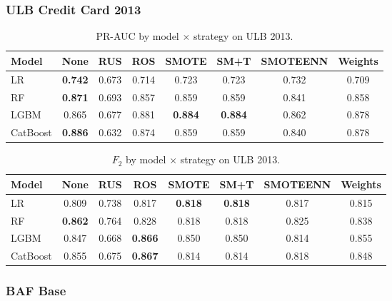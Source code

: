 
\subsubsection{ULB Credit Card 2013}

\begin{table}[ht]
\centering
\caption{PR-AUC by model $\times$ strategy on ULB 2013.}
\label{tab:factorial_ulb_prauc}
\begin{tabular}{l c c c c c c c}
\toprule
Model & None & RUS & ROS & SMOTE & SM+T & SMOTEENN & Weights \\
\midrule
LR         & \textbf{0.742} & 0.673 & 0.714 & 0.723 & 0.723 & 0.732 & 0.709 \\
RF         & \textbf{0.871} & 0.693 & 0.857 & 0.859 & 0.859 & 0.841 & 0.858 \\
LGBM       & 0.865 & 0.677 & 0.881 & \textbf{0.884} & \textbf{0.884} & 0.862 & 0.878 \\
CatBoost   & \textbf{0.886} & 0.632 & 0.874 & 0.859 & 0.859 & 0.840 & 0.878 \\
\bottomrule
\end{tabular}
\end{table}

\begin{table}[ht]
\centering
\caption{$F_2$ by model $\times$ strategy on ULB 2013.}
\label{tab:factorial_ulb_f2}
\begin{tabular}{l c c c c c c c}
\toprule
Model & None & RUS & ROS & SMOTE & SM+T & SMOTEENN & Weights \\
\midrule
LR         & 0.809 & 0.738 & 0.817 & \textbf{0.818} & \textbf{0.818} & 0.817 & 0.815 \\
RF         & \textbf{0.862} & 0.764 & 0.828 & 0.818 & 0.818 & 0.825 & 0.838 \\
LGBM       & 0.847 & 0.668 & \textbf{0.866} & 0.850 & 0.850 & 0.814 & 0.855 \\
CatBoost   & 0.855 & 0.675 & \textbf{0.867} & 0.814 & 0.814 & 0.818 & 0.848 \\
\bottomrule
\end{tabular}
\end{table}


\subsubsection{BAF Base}

